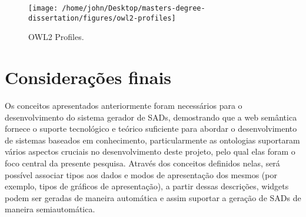 \begin{figure}[H]
\texttt{[image: /home/john/Desktop/masters-degree-dissertation/figures/owl2-profiles]}

\caption{OWL2 Profiles.\label{fig:OWL2-Profiles}}
\end{figure}


\section{Considerações finais}

Os conceitos apresentados anteriormente foram necessários para o desenvolvimento
do sistema gerador de SADs, demostrando que a web semântica fornece
o suporte tecnológico e teórico suficiente para abordar o desenvolvimento
de sistemas baseados em conhecimento, particularmente as ontologias
suportaram vários aspectos cruciais no desenvolvimento deste projeto,
pelo qual elas foram o foco central da presente pesquisa. Através
dos conceitos definidos nelas, será possível associar tipos aos dados
e modos de apresentação dos mesmos (por exemplo, tipos de gráficos
de apresentação), a partir dessas descrições, \foreignlanguage{english}{widgets}
podem ser geradas de maneira automática e assim suportar a geração
de SADs de maneira semiautomática.
